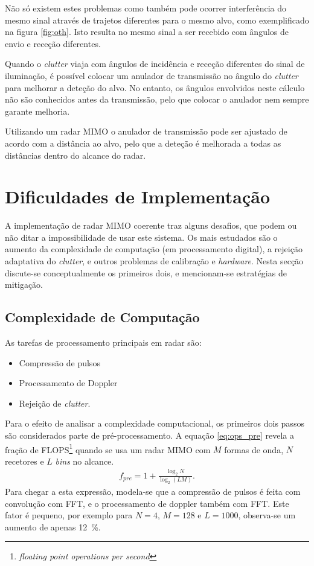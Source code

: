 \documentclass[purist,portuguese]{ist-report}
\begin{document}
Não só existem estes problemas como também pode ocorrer interferência do mesmo sinal através de trajetos diferentes para o mesmo alvo, como exemplificado na figura \ref{fig:oth}. Isto resulta no mesmo sinal a ser recebido com ângulos de envio e receção diferentes.

Quando o \textit{clutter} viaja com ângulos de incidência e receção diferentes do sinal de iluminação, é possível colocar um anulador de transmissão no ângulo do \textit{clutter} para melhorar a deteção do alvo. No entanto, os ângulos envolvidos neste cálculo não são conhecidos antes da transmissão, pelo que colocar o anulador nem sempre garante melhoria.

Utilizando um radar MIMO o anulador de transmissão pode ser ajustado de acordo com a distância ao alvo, pelo que a deteção é melhorada a todas as distâncias dentro do alcance do radar.

\section{Dificuldades de Implementação}

A implementação de radar MIMO coerente traz alguns desafios, que podem ou não ditar a impossibilidade de usar este sistema. 
Os mais estudados são o aumento da complexidade de computação (em processamento digital), a rejeição adaptativa do \textit{clutter}, e outros problemas de calibração e \textit{hardware}.
Nesta secção discute-se conceptualmente os primeiros dois, e mencionam-se estratégias de mitigação.

\subsection{Complexidade de Computação}

As tarefas de processamento principais em radar são:
\begin{itemize}
  \item Compressão de pulsos
  \item Processamento de Doppler
  \item Rejeição de \textit{clutter}.
\end{itemize}

Para o efeito de analisar a complexidade computacional, os primeiros dois passos são considerados parte de pré-processamento.
A equação \ref{eq:ops_pre} revela a fração de FLOPS\footnote{\textit{floating point operations per second}} quando se usa um radar MIMO com $M$ formas de onda, $N$ recetores e $L$ \textit{bins} no alcance.
\begin{align}
  f_{pre}=1+\frac{\log_2 N}{\log_2 (LM)}.
  \label{eq:ops_pre}
\end{align}
Para chegar a esta expressão, modela-se que a compressão de pulsos é feita com convolução com FFT, e o processamento de doppler também com FFT.
Este fator é pequeno, por exemplo para $N=4$, $M=128$ e $L=1000$, observa-se um aumento de apenas \SI{12}{\percent}. 
\end{document}
